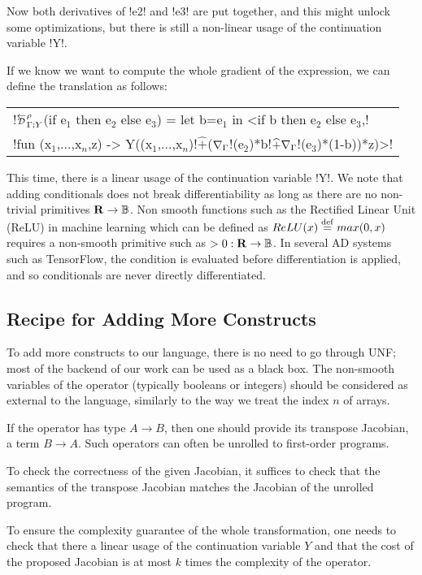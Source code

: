 Now both derivatives of !e2! and !e3! are put together, and this might unlock some optimizations, 
but there is still a non-linear usage of the continuation variable !Y!.

If we know we want to compute the whole gradient of the expression, we can define the translation as follows:

\begin{tabular}{l}
    !$\directD{\rho}{\Gamma}{Y}$(if e$_1$ then e$_2$ else e$_3$) = let b=e$_1$ in <if b then e$_2$ else e$_3$,! \\
    !fun (x$_1$,$\ldots$,x$_n$,z) -> Y((x$_1$,$\ldots$,x$_n$)!$\widehat{+}$($\nabla_\Gamma$!(e$_2$)*b!$\widehat{+}\nabla_\Gamma$!(e$_3$)*(1-b))*z)>!\\
\end{tabular}

This time, there is a linear usage of the continuation variable !Y!. We note that adding conditionals does not break differentiability as long as there are no non-trivial primitives $\mathbf{R}\to\mathbb{B}$.
Non smooth functions such as the Rectified Linear Unit (ReLU) in machine learning which can be defined as $ReLU(x)\stackrel {\mathrm{def}}= max(0,x)$ 
requires a non-smooth primitive such as $>0: \mathbf{R}\to\mathbb{B}$. In several AD systems such as TensorFlow, 
the condition is evaluated before differentiation is applied, and so conditionals are never directly differentiated.

\subsection{Recipe for Adding More Constructs}
\label{sub:lift_recipe}
To add more constructs to our language, 
there is no need to go through UNF; most of the backend of our work can be used as a black box.
The non-smooth variables of the operator (typically booleans or integers) should be considered as external to the language, similarly to the way we treat the index $n$ of arrays.

If the operator has type $A\to B$, then one should provide its transpose Jacobian, a term $B\to A$. 
Such operators can often be unrolled to first-order programs. 

To check the correctness of the given Jacobian, it suffices to 
check that the semantics of the transpose Jacobian matches the Jacobian of the unrolled program. 

To ensure the complexity guarantee of the whole transformation, one needs to check that there a linear usage of the continuation variable $Y$ and that the cost of the 
proposed Jacobian is at most $k$ times the complexity of the operator. 
